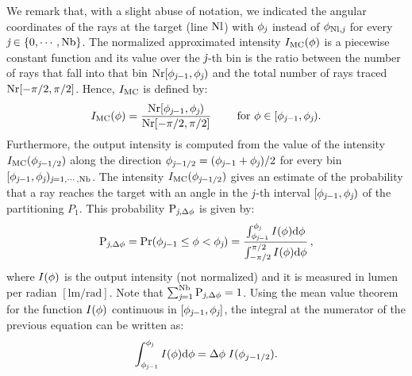 We remark that, with a slight abuse of notation, we indicated the angular coordinates of the rays at the target (line $\textrm{Nl}$) with $\phi_{\textit{j}}$ instead of $\phi_{\textrm{Nl},\textit{j}}$ for every $\textit{j}\in\{0, \cdots, \textrm{Nb}\}$.
The normalized approximated intensity $I_{\textrm{MC}}(\phi)$ is a piecewise constant function and its value over the $\textit{j}$-th bin is the ratio between the number of rays that fall into that bin
$\textrm{Nr}[\phi_{\textit{j}-1},\phi_{\textit{j}})$ and the total number of rays traced $\textrm{Nr}[-\pi/2, \pi/2]$.
Hence, $I_{\textrm{MC}}$ is defined by:
\begin{equation} \label{g_mc}
I_{\textrm{MC}}(\phi) = \frac{\textrm{Nr}[\phi_{\textit{j}-1},\phi_{\textit{j}})}{\textrm{Nr}[-\pi/2, \pi/2]} \qquad \mbox{ for } \phi\in[\phi_{\textit{j}-1}, \phi_{\textit{j}}).
\end{equation}
Furthermore, the output intensity is computed from the value of the intensity $I_{\textrm{MC}}(\phi_{\textit{j}-1/2})$ along the direction $\phi_{\textit{j}-1/2}=(\phi_{\textit{j}-1}+
\phi_{\textit{j}})/2$ for every bin $[\phi_{\textit{j}-1},\phi_{\textit{j}})_{\textit{j} = 1, \cdots, \textrm{Nb}}$.
 The intensity $I_{\textrm{MC}}(\phi_{\textit{j}-1/2})$ gives an estimate of the probability that a ray reaches the target with an angle in the $\textit{j}$-th interval 
$[\phi_{\textit{j}-1}, \phi_{\textit{j}})$ of the partitioning $P_1$. This probability $\textrm{P}_{\textit{j}, \Delta\phi}$ is given by:
\begin{equation}\label{eq:probability}
\textrm{P}_{\textit{j}, \Delta\phi} = \Pr(\phi_{\textit{j}-1}\leq\phi<\phi_{\textit{j}})= 
\frac{\int_{\phi_{\textit{j}-1}}^{\phi_{\textit{j}}} I(\phi) \textrm{d}\phi}{\int_{-\pi/2}^{\pi/2}I(\phi) \textrm{d}\phi}\,,
\end{equation}
where $I(\phi)$ is the output intensity (not normalized) and it is measured in lumen per radian $[\textrm{lm}/\textrm{rad}]$.
Note that $\sum_{\textit{j}=1}^{\textrm{Nb}}\textrm{P}_{\textit{j}, \Delta\phi}=1$. Using the mean value theorem for the function 
$I(\phi)$ continuous in $[\phi_{\textit{j}-1}, \phi_{\textit{j}}]$, the integral at the numerator of the previous equation can be written as: \begin{equation}
\int_{\phi_{\textit{j}-1}}^{\phi_{\textit{j}}} I(\phi) \textrm{d}\phi = \Delta \phi\;I(\phi_{j-1/2}).
\end{equation}
